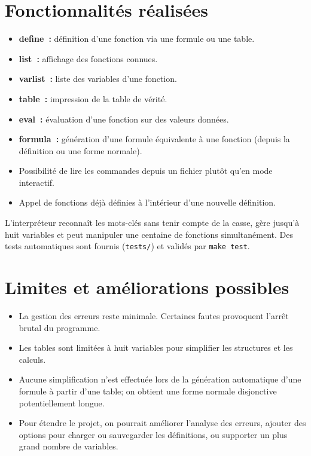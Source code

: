 \documentclass[a4paper,11pt]{article}
\begin{document}
\section*{Fonctionnalités réalisées}
\begin{itemize}
    \item \textbf{define~:} définition d'une fonction via une formule ou une table.
    \item \textbf{list~:} affichage des fonctions connues.
    \item \textbf{varlist~:} liste des variables d'une fonction.
    \item \textbf{table~:} impression de la table de vérité.
    \item \textbf{eval~:} évaluation d'une fonction sur des valeurs données.
    \item \textbf{formula~:} génération d'une formule équivalente à une fonction (depuis la définition ou une forme normale).
    \item Possibilité de lire les commandes depuis un fichier plutôt qu'en mode interactif.
    \item Appel de fonctions déjà définies à l'intérieur d'une nouvelle définition.
\end{itemize}
L'interpréteur reconnaît les mots-clés sans tenir compte de la casse, gère jusqu'à huit variables et peut manipuler une centaine de fonctions simultanément.  Des tests automatiques sont fournis (\verb|tests/|) et validés par \verb|make test|.

\section*{Limites et améliorations possibles}
\begin{itemize}
    \item La gestion des erreurs reste minimale.  Certaines fautes provoquent l'arrêt brutal du programme.
    \item Les tables sont limitées à huit variables pour simplifier les structures et les calculs.
    \item Aucune simplification n'est effectuée lors de la génération automatique d'une formule à partir d'une table; on obtient une forme normale disjonctive potentiellement longue.
    \item Pour étendre le projet, on pourrait améliorer l'analyse des erreurs, ajouter des options pour charger ou sauvegarder les définitions, ou supporter un plus grand nombre de variables.
\end{itemize}
\end{document}
